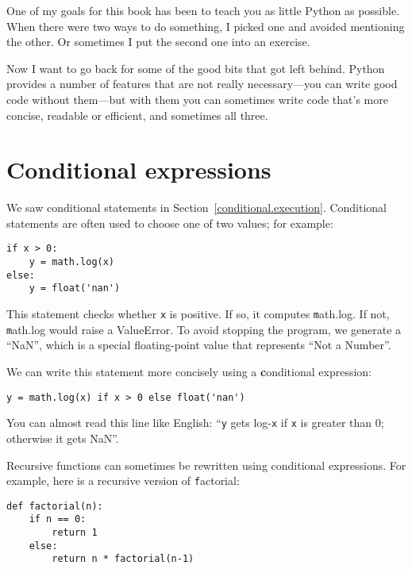 \documentclass[
DIV=11,
fontsize=12,
twoside,
headinclude=false,
titlepage=firstiscover,
abstract=true,
headsepline=true,
footsepline=true,
chapterprefix=true, %
headings=big,
bibliography=totoc,%
captions=tableheading
]{scrbook}
\theoremstyle{definition}
\begin{document}
One of my goals for this book has been to teach you as little Python
as possible.  When there were two ways to do something, I picked 
one and avoided mentioning the other.  Or sometimes I put the second
one into an exercise.

Now I want to go back for some of the good bits that got left behind.
Python provides a number of features that are not really necessary---you
can write good code without them---but with them you can sometimes
write code that's more concise, readable or efficient, and sometimes
all three.


\section{Conditional expressions}

We saw conditional statements in Section~\ref{conditional.execution}.
Conditional statements are often used to choose one of two values;
for example:

\begin{lstlisting}
if x > 0:
    y = math.log(x)
else:
    y = float('nan')
\end{lstlisting}

This statement checks whether {\texttt x} is positive.  If so, it computes
{\texttt math.log}.  If not, {\texttt math.log} would raise a ValueError.  To
avoid stopping the program, we generate a ``NaN'', which is a special
floating-point value that represents ``Not a Number''.

We can write this statement more concisely using a {\textbf conditional
expression}:

\begin{lstlisting}
y = math.log(x) if x > 0 else float('nan')
\end{lstlisting}

You can almost read this line like English: ``{\texttt y} gets log-{\texttt x}
if {\texttt x} is greater than 0; otherwise it gets NaN''.

Recursive functions can sometimes be rewritten using conditional
expressions.  For example, here is a recursive version of {\texttt factorial}:

\begin{lstlisting}
def factorial(n):
    if n == 0:
        return 1
    else:
        return n * factorial(n-1)
\end{lstlisting}
\end{document}
